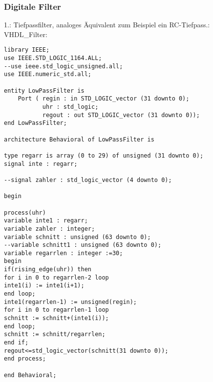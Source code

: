 \documentclass{article}
\begin{document}
\subsubsection{Digitale Filter}
1.:\newline
Tiefpassfilter, analoges \"Aquivalent zum Beispiel ein RC-Tiefpass.:\newline
VHDL\_Filter:\newline
\begin{verbatim}
library IEEE;
use IEEE.STD_LOGIC_1164.ALL;
--use ieee.std_logic_unsigned.all;
use IEEE.numeric_std.all;

entity LowPassFilter is
    Port ( regin : in STD_LOGIC_vector (31 downto 0);
           uhr : std_logic;
           regout : out STD_LOGIC_vector (31 downto 0));
end LowPassFilter;

architecture Behavioral of LowPassFilter is

type regarr is array (0 to 29) of unsigned (31 downto 0);
signal inte : regarr;

--signal zahler : std_logic_vector (4 downto 0);

begin

process(uhr)
variable inte1 : regarr;
variable zahler : integer;
variable schnitt : unsigned (63 downto 0);
--variable schnitt1 : unsigned (63 downto 0);
variable regarrlen : integer :=30;
begin
if(rising_edge(uhr)) then
for i in 0 to regarrlen-2 loop
inte1(i) := inte1(i+1);
end loop;
inte1(regarrlen-1) := unsigned(regin);
for i in 0 to regarrlen-1 loop
schnitt := schnitt+(inte1(i));
end loop;
schnitt := schnitt/regarrlen;
end if;
regout<=std_logic_vector(schnitt(31 downto 0));
end process;

end Behavioral;
\end{verbatim}
\end{document}

